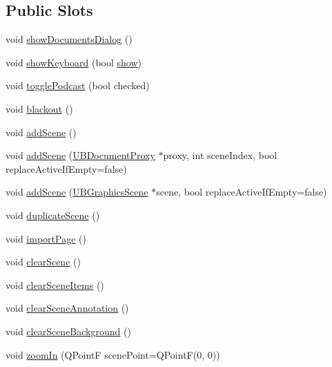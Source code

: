 \subsection*{Public Slots}
\begin{DoxyCompactItemize}
\item 
void \hyperlink{class_u_b_board_controller_afdb0ce0373651a6351e3af1ad35c6cb5}{show\-Documents\-Dialog} ()
\item 
void \hyperlink{class_u_b_board_controller_afe5b00725eb8f522892c0730f2ef0e08}{show\-Keyboard} (bool \hyperlink{class_u_b_board_controller_a4d5e22da0b52e04622837b0c1280e67b}{show})
\item 
void \hyperlink{class_u_b_board_controller_a6171228fc58d8afaff61bd3ba06103ca}{toggle\-Podcast} (bool checked)
\item 
void \hyperlink{class_u_b_board_controller_a78633b7cc8144607a3c0919c4237c26c}{blackout} ()
\item 
void \hyperlink{class_u_b_board_controller_aae6e6e83f5207333812d4021dc7f535e}{add\-Scene} ()
\item 
void \hyperlink{class_u_b_board_controller_a93f888fe0605f87d49e93f66805f0ad2}{add\-Scene} (\hyperlink{class_u_b_document_proxy}{U\-B\-Document\-Proxy} $\ast$proxy, int scene\-Index, bool replace\-Active\-If\-Empty=false)
\item 
void \hyperlink{class_u_b_board_controller_aa6b980ad198948e01707821585f1ed23}{add\-Scene} (\hyperlink{class_u_b_graphics_scene}{U\-B\-Graphics\-Scene} $\ast$scene, bool replace\-Active\-If\-Empty=false)
\item 
void \hyperlink{class_u_b_board_controller_af1a84b94fde6cc9e91d9f60723e70a00}{duplicate\-Scene} ()
\item 
void \hyperlink{class_u_b_board_controller_a3c02908763bd2bb49d7006cbf2f1cff8}{import\-Page} ()
\item 
void \hyperlink{class_u_b_board_controller_aa05f3be4a1645d76f034f38269fc6cf0}{clear\-Scene} ()
\item 
void \hyperlink{class_u_b_board_controller_a3fe7c336f24feec07902020905386ca0}{clear\-Scene\-Items} ()
\item 
void \hyperlink{class_u_b_board_controller_ab47067d535d9086bd8e9e84176c02036}{clear\-Scene\-Annotation} ()
\item 
void \hyperlink{class_u_b_board_controller_a7c98cc515d722b671686bb6a77a89a3b}{clear\-Scene\-Background} ()
\item 
void \hyperlink{class_u_b_board_controller_a8ba0b7e674be504d0547c6ce94a92a4b}{zoom\-In} (Q\-Point\-F scene\-Point=Q\-Point\-F(0, 0))

\end{DoxyCompactItemize}
